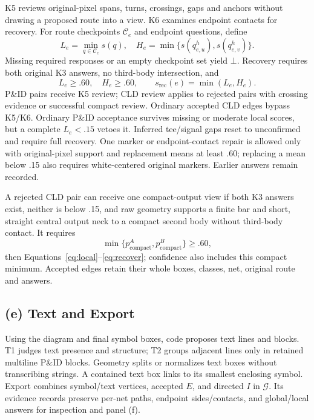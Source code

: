 \documentclass[sigconf,review]{acmart}
\begin{document}
K5 reviews original-pixel spans, turns, crossings, gaps and anchors without drawing a proposed route into a view. K6 examines endpoint contacts for recovery. For route checkpoints $\mathcal C_e$ and endpoint questions, define
\begin{equation}
 L_e=\min_{q\in\mathcal C_e}s(q),\quad
 H_e=\min\{s(q_{e,u}^h),s(q_{e,v}^h)\}.
 \label{eq:local}
\end{equation}
Missing required responses or an empty checkpoint set yield $\bot$. Recovery requires both original K3 answers, no third-body intersection, and
\begin{equation}
 L_e\ge .60,\quad H_e\ge .60,\qquad
 s_{\mathrm{rec}}(e)=\min(L_e,H_e).
 \label{eq:recover}
\end{equation}
P\&ID pairs receive K5 review; CLD review applies to rejected pairs with crossing evidence or successful compact review. Ordinary accepted CLD edges bypass K5/K6. Ordinary P\&ID acceptance survives missing or moderate local scores, but a complete $L_e<.15$ vetoes it. Inferred tee/signal gaps reset to unconfirmed and require full recovery. One marker or endpoint-contact repair is allowed only with original-pixel support and replacement means at least .60; replacing a mean below .15 also requires white-centered original markers. Earlier answers remain recorded.

A rejected CLD pair can receive one compact-output view if both K3 answers exist, neither is below .15, and raw geometry supports a finite bar and short, straight central output neck to a compact second body without third-body contact. It requires
\begin{equation}
 \min\{p_{\mathrm{compact}}^A,p_{\mathrm{compact}}^B\}\ge .60,
 \label{eq:compact}
\end{equation}
then Equations~\eqref{eq:local}--\eqref{eq:recover}; confidence also includes this compact minimum. Accepted edges retain their whole boxes, classes, net, original route and answers.

\subsection{(e) Text and Export}
\label{sec:export}
Using the diagram and final symbol boxes, code proposes text lines and blocks. T1 judges text presence and structure; T2 groups adjacent lines only in retained multiline P\&ID blocks. Geometry splits or normalizes text boxes without transcribing strings. A contained text box links to its smallest enclosing symbol. Export combines symbol/text vertices, accepted $E$, and directed $I$ in $\mathcal G$. Its evidence records preserve per-net paths, endpoint sides/contacts, and global/local answers for inspection and panel (f).
\end{document}
